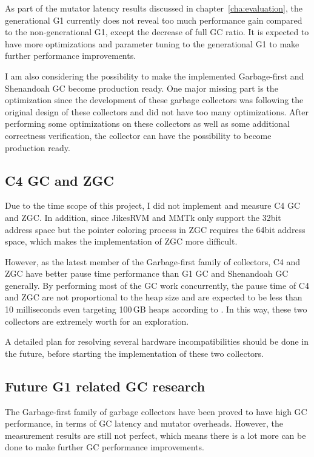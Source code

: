 As part of the mutator latency results discussed in chapter~\ref{cha:evaluation},
the generational G1 currently does not reveal too much performance gain compared to
the non-generational G1, except the decrease of full GC ratio. It is expected to have more optimizations and parameter
tuning to the generational G1 to make further performance improvements.

I am also considering the possibility to make the implemented Garbage-first
and Shenandoah GC become production ready. One major missing part is the optimization
since the development of these garbage collectors was following the original design
of these collectors and did not have too many optimizations. After performing some
optimizations on these collectors as well as some additional correctness verification,
the collector can have the possibility to become production ready.

\subsection{C4 GC and ZGC}

Due to the time scope of this project, I did not implement and measure C4 GC and ZGC.
In addition, since JikesRVM and MMTk only support the 32bit address space but the pointer
coloring process in ZGC requires the 64bit address space, which makes the implementation
of ZGC more difficult.

However, as the latest member of the Garbage-first family of collectors, C4 and ZGC
have better pause time performance than G1 GC and Shenandoah GC generally.
By performing most of the GC work concurrently, the pause time of C4 and ZGC are not proportional to the heap size and
are expected to be less than 10 milliseconds even targeting 100\,GB heaps according to \cite{liden_karlsson_2018}.
In this way, these two collectors are extremely worth for an exploration.

A detailed plan for resolving several hardware incompatibilities should be done in the future,
before starting the implementation of these two collectors.

\subsection{Future G1 related GC research}

The Garbage-first family of garbage collectors have been proved to have high GC performance,
in terms of GC latency and mutator overheads. However, the measurement results are still
not perfect, which means there is a lot more can be done to make further GC performance improvements.

